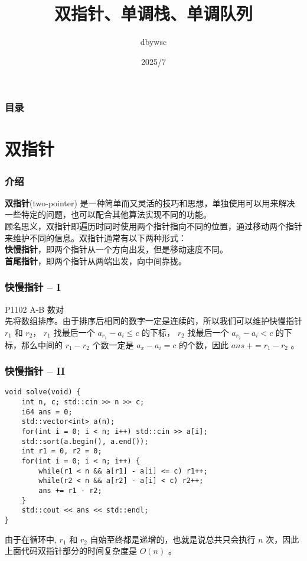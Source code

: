\documentclass{beamer}
\title{双指针、单调栈、单调队列}
\author{dbywsc}
\date{2025/7}
\newcommand{\fdf}[1]{\alert{\textbf{#1}}}
\begin{document}
\frame{\titlepage}
\begin{frame}
	\frametitle{目录}
	\tableofcontents
\end{frame}
\section{双指针}
\begin{frame}
\frametitle{介绍}
\fdf{双指针}(two-pointer) 是一种简单而又灵活的技巧和思想，单独使用可以用来解决一些特定的问题，也可以配合其他算法实现不同的功能。\\ 
顾名思义，双指针即遍历时同时使用两个指针指向不同的位置，通过移动两个指针来维护不同的信息。双指针通常有以下两种形式：\\ 
\fdf{快慢指针}，即两个指针从一个方向出发，但是移动速度不同。\\ 
\fdf{首尾指针}，即两个指针从两端出发，向中间靠拢。
\end{frame}
\begin{frame}
\frametitle{快慢指针 -- I}
P1102 A-B 数对 \\ 
先将数组排序。由于排序后相同的数字一定是连续的，所以我们可以维护快慢指针 $r_1$ 和 $r_2$， $r_1$ 找最后一个 $a_{r_1} - a_i \leq c$ 的下标， $r_2$ 找最后一个 $a_{r_2} - a_i < c$ 的下标，那么中间的 $r_1 - r_2$ 个数一定是 $a_x - a_i = c$ 的个数，因此 $ans \ += r_1 - r_2$ 。
\end{frame}
\begin{frame}[fragile]
\frametitle{快慢指针 -- II}
\begin{onlyenv}
\begin{verbatim}
void solve(void) {
    int n, c; std::cin >> n >> c;
    i64 ans = 0;
    std::vector<int> a(n);
    for(int i = 0; i < n; i++) std::cin >> a[i];
    std::sort(a.begin(), a.end());
    int r1 = 0, r2 = 0;
    for(int i = 0; i < n; i++) {
        while(r1 < n && a[r1] - a[i] <= c) r1++;
        while(r2 < n && a[r2] - a[i] < c) r2++;
        ans += r1 - r2;
    }
    std::cout << ans << std::endl;
}
\end{verbatim}
\end{onlyenv}
由于在循环中, $r_1$ 和 $r_2$ 自始至终都是递增的，也就是说总共只会执行 $n$ 次，因此上面代码双指针部分的时间复杂度是 $O(n)$ 。
\end{frame}
\end{document}
